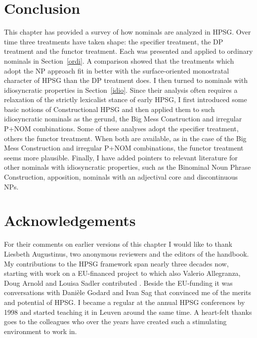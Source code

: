 \documentclass[output=paper
	        ,collection
	        ,collectionchapter
 	        ,biblatex
                ,babelshorthands
                ,newtxmath
                ,draftmode
                ,colorlinks, citecolor=brown
]{langscibook}
\begin{document}
\section{Conclusion} 


This chapter has provided a survey of how nominals are analyzed in HPSG. 
Over time three treatments have taken shape: the specifier treatment, 
the DP treatment and the functor treatment. 
Each was presented and applied to ordinary nominals in Section~\ref{ordi}. 
A comparison showed that the treatments which adopt the NP approach fit in better with 
the surface-oriented monostratal character of HPSG than the DP treatment does.
I then turned to nominals with idiosyncratic properties in Section~\ref{idio}.
Since their analysis often requires a relaxation of the strictly lexicalist stance of early HPSG, 
I first introduced some basic notions of Constructional HPSG and then applied them to 
such idiosyncratic nominals as the gerund, the Big Mess Construction and irregular P+NOM combinations.  
Some of these analyses adopt the specifier treatment, others the functor treatment. 
When both are available, as in the case of the Big Mess Construction and  
irregular P+NOM combinations, the functor treatment seems more plausible. 
Finally, I have added pointers to relevant literature for other nominals with idiosyncratic properties,
such as the Binominal Noun Phrase Construction, apposition, nominals with an adjectival core  
and discontinuous NPs. 

 
\section*{Acknowledgements}


For their comments on earlier versions of this chapter I would like to thank 
Liesbeth Augustinus, two anonymous reviewers and the editors of the handbook.  
My contributions to the HPSG framework span nearly three decades now, 
starting with work on a EU-financed project to which also Valerio Allegranza, 
Doug Arnold and Louisa Sadler contributed \citep{VanEyndeSchmidt98}. 
Beside the EU-funding it was conversations with Dani\`ele Godard and Ivan Sag 
that convinced me of the merits and potential of HPSG.  
I became a regular at the annual HPSG conferences by 1998 and started teaching it in Leuven around 
the same time. A heart-felt thanks goes to the colleagues who over the years have created such a stimulating
environment to work in.        

{\sloppy
\printbibliography[heading=subbibliography,notkeyword=this] 
}
\end{document}
